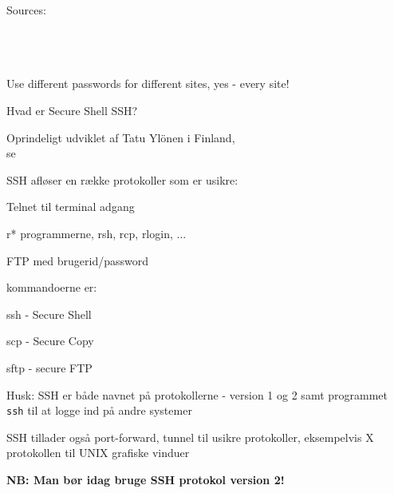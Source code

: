 \documentclass[Screen16to9,17pt]{foils}
\begin{document}

 Sources:\\
{\footnotesize{}\\
\\
\\
}

\vskip 5mm
\centerline{Use different passwords for different sites, yes - every site!}







\begin{list1}
\item Hvad er Secure Shell SSH?
\item Oprindeligt udviklet af Tatu Ylönen i Finland,\\
se 
\item SSH afløser en række protokoller som er usikre:
  \begin{list2}
  \item Telnet til terminal adgang
  \item r* programmerne, rsh, rcp, rlogin, ...
  \item FTP med brugerid/password
  \end{list2}
\end{list1}


\begin{list1}
\item kommandoerne er:
\begin{list2}
  \item ssh - Secure Shell
  \item scp - Secure Copy
  \item sftp - secure FTP
  \end{list2}
\item Husk: SSH er både navnet på protokollerne - version 1 og 2 samt
  programmet \verb+ssh+ til at logge ind på andre systemer
\item SSH tillader også port-forward, tunnel til usikre protokoller,
  eksempelvis X protokollen til UNIX grafiske vinduer
\item {\bfseries NB: Man bør idag bruge SSH protokol version 2!}
\end{list1}
\end{document}
